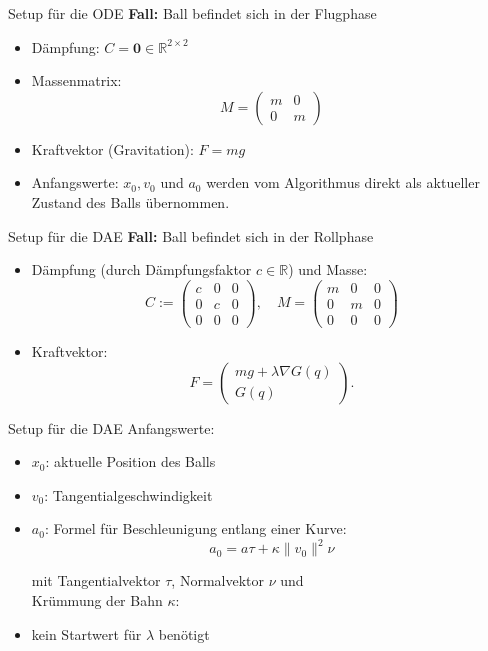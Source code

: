 \documentclass[aspectratio=169]{beamer}
\begin{document}
\begin{frame}{Setup für die ODE}
\textbf{Fall:} Ball befindet sich in der Flugphase\\
\pause
\vspace{0.3cm}
	\begin{itemize}
		\item Dämpfung: $C = \mathbf{0} \in \mathbb{R}^{2 \times 2}$
		\item Massenmatrix:
		\[
		M =
		\begin{pmatrix}
			m & 0 \\
			0 & m
		\end{pmatrix}
		\]
		\item Kraftvektor (Gravitation): \quad $F = m g$
		\item Anfangswerte: $x_0, v_0$ und $a_0$ werden vom Algorithmus direkt als aktueller Zustand des Balls übernommen.
	\end{itemize}
\end{frame}

\begin{frame}{Setup für die DAE}
\textbf{Fall:} Ball befindet sich in der Rollphase\\
\pause
\vspace{0.3cm}
\begin{itemize}
	\item Dämpfung (durch Dämpfungsfaktor $c \in \mathbb{R}$) und Masse:
	\begin{equation*}
		C :=
		\begin{pmatrix}
			c & 0 & 0\\
			0 & c & 0\\
			0 & 0 & 0
		\end{pmatrix},
		\quad
		M =
		\begin{pmatrix}
			m & 0 & 0 \\
			0 & m & 0 \\
			0 & 0 & 0
		\end{pmatrix}
	\end{equation*}
	\item Kraftvektor:
	\[F =
	\begin{pmatrix}
		mg + \lambda \nabla G(q)\\
		G(q)
	\end{pmatrix}.
	\]
\end{itemize}
\end{frame}

\begin{frame}{Setup für die DAE}
Anfangswerte:
\begin{itemize}
	\item $x_0$: aktuelle Position des Balls
	\item $v_0$: Tangentialgeschwindigkeit
	\item $a_0$: Formel für Beschleunigung entlang einer Kurve:
	\[
	a_0 = a \tau + \kappa \| v_0 \|^2 \nu
	\]

	\qquad mit Tangentialvektor $\tau$, Normalvektor $\nu$ und\\
	\qquad Krümmung der Bahn $\kappa$:

	\item kein Startwert für $\lambda$ benötigt
\end{itemize}
\end{frame}
\end{document}
